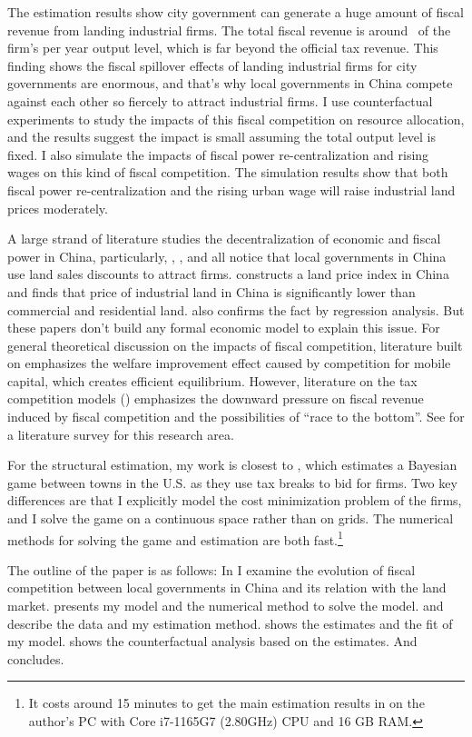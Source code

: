The estimation results show city government can generate a huge amount of fiscal revenue from
landing industrial firms.
The total fiscal revenue is around \estbetapercent ~of the firm's
per year output level, which is far beyond the official tax revenue.
This finding shows the fiscal spillover effects
of landing industrial firms for city governments are enormous,
and that's why local governments in China compete against each other so fiercely
to attract industrial firms.
I use counterfactual experiments to study the impacts of this fiscal competition on resource allocation,
and the results suggest the impact is small assuming the total output level is fixed.
I also simulate the impacts of fiscal power re-centralization and rising wages on this kind of
fiscal competition.
The simulation results show that both fiscal power re-centralization and the rising urban wage
will raise industrial land prices moderately.

A large strand of literature studies the decentralization of economic and fiscal power in China,
particularly,
\cite{cheung2014economic}, \cite{su2017china}, \cite{bai2020special}
and \cite{LiuXiong+2020+183+207}
all notice that local governments in China use land sales discounts to attract firms.
\cite{chen2017real} constructs a land price index in China and finds that price of
industrial land in China is significantly lower than commercial and residential land.
\cite{bai2020special} also confirms the fact by regression analysis.
But these papers don't build any formal economic model to explain this issue.
For general theoretical discussion on the impacts of fiscal competition,
literature built on \cite{tiebout1956pure} emphasizes the welfare improvement effect caused by
competition for mobile capital, which creates efficient equilibrium.
However, literature on the tax competition models (\citealp{keen1997fiscal,wilson1999theories})
emphasizes the downward pressure on fiscal revenue induced by fiscal competition and
the possibilities of ``race to the bottom''.
See \cite{wilson1999theories} for a literature survey for this research area.

For the structural estimation, my work is closest to \cite{mast2020race},
which estimates a Bayesian game between towns in the U.S.
as they use tax breaks to bid for firms.
Two key differences are that I explicitly model the cost minimization problem of the firms, and I solve
the game on a continuous space rather than on grids. The numerical methods for solving the game and
estimation are both fast.\footnote{
    It costs around 15 minutes to get the main estimation results in 
    on the author's PC with Core i7-1165G7 (2.80GHz) CPU and 16 GB RAM.}

The outline of the paper is as follows: In  I examine the evolution
of fiscal competition between local governments in China and its relation with the land market.
 presents my model and the numerical method to solve the model.
 and  describe the data and my estimation method.
 shows the estimates and the fit of my model.
 shows the counterfactual analysis based on the estimates.
And  concludes.


